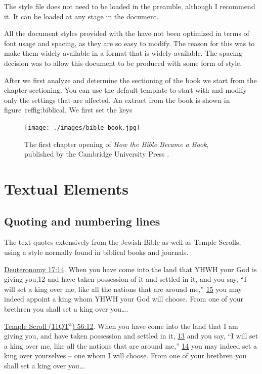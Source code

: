 The style file does not need to be loaded in the preamble, although I recommend it. It can be loaded at
any stage in the document.

All the document styles provided with the  have not been optimized in terms of font usage and spacing, as they are so easy to modify. The reason for this was to make them widely available in a format that
is widely available. The spacing decision was to allow this document to be produced with some form of style.

After we first analyze and determine the sectioning of the book we start from the chapter sectioning. You can use the default template to start with and modify only the settings that are affected. An extract from the book is shown in figure~ref{fig:biblical}. We first set the keys

\begin{figure}[htb]
\texttt{[image: ./images/bible-book.jpg]}
\caption{The first chapter opening of \textit{How the Bible Became a Book}, published by the Cambridge University Press \protect\citep{schniedewind2005}.}
\label{fig:biblical}
\end{figure}

\section{Textual Elements}
\subsection{Quoting and numbering lines}

The text quotes extensively from the Jewish Bible as well as Temple Scrolls, using a style normally found in biblical books and journals.
\medskip

{\normalsize

\noindent\underline{Deuteronomy 17:14}. When you have come into the land that YHWH your God is
giving you,12 and have taken possession of it and settled in it, and you say, “I will set
a king over me, like all the nations that are around me,” \underline{15} you may indeed appoint
a king whom YHWH your God will choose. From one of your brethren you shall set
a king over you\ldots.
\medskip

\noindent\underline{Temple Scroll (11QT$^{\text{a}}$) 56:12}.  When you have come into the land that I am giving
you, and have taken possession and settled in it, \ul{13} and you say, “I will set a king
over me, like all the nations that are around me,” \ul{14} you may indeed set a king over
yourselves – one whom I will choose. From one of your brethren you shall set a king
over you\ldots.}
\medskip

